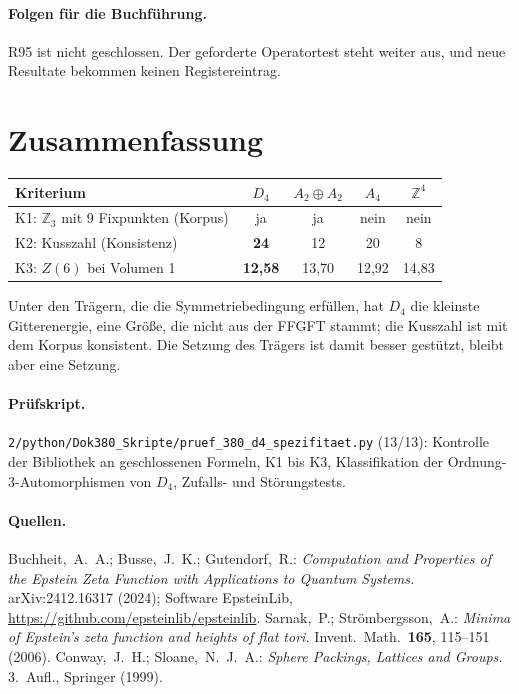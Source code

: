 \paragraph{Folgen für die Buchführung.}
R95 ist nicht geschlossen. Der geforderte Operatortest steht weiter aus, und
neue Resultate bekommen keinen Registereintrag.

\section{Zusammenfassung}

\begin{center}
\begin{tabular}{>{\raggedright\arraybackslash}p{3.2cm}cccc}
\toprule
Kriterium & $D_4$ & $A_2\oplus A_2$ & $A_4$ & $\mathbb{Z}^4$ \\
\midrule
K1: $\mathbb{Z}_3$ mit 9 Fixpunkten (Korpus) & ja & ja & nein & nein \\
K2: Kusszahl (Konsistenz) & \textbf{24} & 12 & 20 & 8 \\
K3: $Z(6)$ bei Volumen 1 & \textbf{12,58} & 13,70 & 12,92 & 14,83 \\
\bottomrule
\end{tabular}
\end{center}

Unter den Trägern, die die Symmetriebedingung erfüllen, hat $D_4$ die
kleinste Gitterenergie, eine Größe, die nicht aus der FFGFT stammt; die
Kusszahl ist mit dem Korpus konsistent. Die Setzung des Trägers ist damit
besser gestützt, bleibt aber eine Setzung.

\paragraph{Prüfskript.} \texttt{2/python/Dok380\_Skripte/pruef\_380\_d4\_spezifitaet.py}
(13/13): Kontrolle der Bibliothek an geschlossenen Formeln, K1 bis K3,
Klassifikation der Ordnung-3-Automorphismen von $D_4$, Zufalls- und
Störungstests.

\paragraph{Quellen.}
Buchheit,~A.~A.; Busse,~J.~K.; Gutendorf,~R.: \textit{Computation and
Properties of the Epstein Zeta Function with Applications to Quantum
Systems.} arXiv:2412.16317 (2024); Software EpsteinLib,
\url{https://github.com/epsteinlib/epsteinlib}.
Sarnak,~P.; Strömbergsson,~A.: \textit{Minima of Epstein's zeta function and
heights of flat tori.} Invent.\ Math.\ \textbf{165}, 115--151 (2006).
Conway,~J.~H.; Sloane,~N.~J.~A.: \textit{Sphere Packings, Lattices and
Groups.} 3.~Aufl., Springer (1999).
